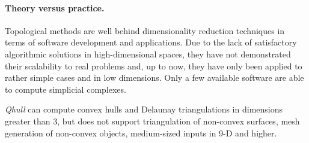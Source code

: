 
\paragraph{Theory versus practice.} 
Topological methods are well behind dimensionality reduction techniques in terms of 
software development and applications.  Due to the lack of satisfactory algorithmic solutions in high-dimensional spaces, they have not demonstrated their scalability to real problems and, up to now, they have only been applied to rather simple cases and in low dimensions.  
%
%
Only a few available software are able to compute simplicial complexes.

{\em Qhull} can compute convex hulls and Delaunay triangulations in dimensions greater than 3, but does not support triangulation of non-convex surfaces, mesh generation of non-convex objects, medium-sized inputs in 9-D and higher.

